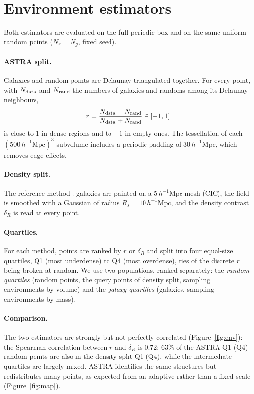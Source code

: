 \documentclass[11pt,twocolumn]{article}
\newcommand{\Mpch}{\,h^{-1}\mathrm{Mpc}}
\begin{document}
\section{Environment estimators}
\label{sec:env}

Both estimators are evaluated on the full periodic box and on the same uniform random points ($N_r = N_g$, fixed seed).

\paragraph{ASTRA split.} Galaxies and random points are Delaunay-triangulated together. For every point, with $N_{\rm data}$ and $N_{\rm rand}$ the numbers of galaxies and randoms among its Delaunay neighbours,
\begin{equation}
r = \frac{N_{\rm data}-N_{\rm rand}}{N_{\rm data}+N_{\rm rand}} \in [-1,1]
\label{eq:astra_r}
\end{equation}
is close to 1 in dense regions and to $-1$ in empty ones. The tessellation of each $(500\Mpch)^3$ subvolume includes a periodic padding of $30\Mpch$, which removes edge effects.

\paragraph{Density split.} The reference method \cite{Paillas2023}: galaxies are painted on a $5\Mpch$ mesh (CIC), the field is smoothed with a Gaussian of radius $R_s=10\Mpch$, and the density contrast $\delta_R$ is read at every point.

\paragraph{Quartiles.} For each method, points are ranked by $r$ or $\delta_R$ and split into four equal-size quartiles, Q1 (most underdense) to Q4 (most overdense), ties of the discrete $r$ being broken at random. We use two populations, ranked separately: the \emph{random quartiles} (random points, the query points of density split, sampling environments by volume) and the \emph{galaxy quartiles} (galaxies, sampling environments by mass).

\paragraph{Comparison.} The two estimators are strongly but not perfectly correlated (Figure~\ref{fig:env}): the Spearman correlation between $r$ and $\delta_R$ is $0.72$; 63\% of the ASTRA Q1 (Q4) random points are also in the density-split Q1 (Q4), while the intermediate quartiles are largely mixed. ASTRA identifies the same structures but redistributes many points, as expected from an adaptive rather than a fixed scale (Figure~\ref{fig:map}).
\end{document}
